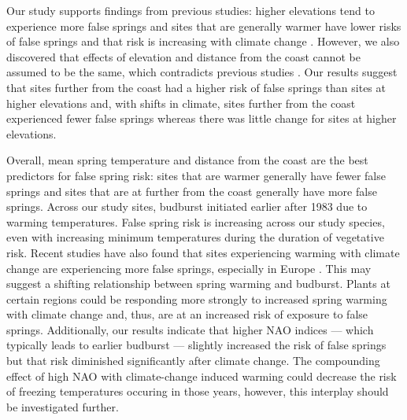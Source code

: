 \documentclass{article}\usepackage[]{graphicx}\usepackage[]{color}
\begin{document}
Our study supports findings from previous studies: higher elevations tend to experience more false springs \citep{Vitra2017} and sites that are generally warmer have lower risks of false springs \citep{Wypych2016} and that risk is increasing with climate change \citep{Liu2018}. However, we also discovered that effects of elevation and distance from the coast cannot be assumed to be the same, which contradicts previous studies \citep{Ma2018}. Our results suggest that sites further from the coast had a higher risk of false springs than sites at higher elevations and, with shifts in climate, sites further from the coast experienced fewer false springs whereas there was little change for sites at higher elevations. 
 
Overall, mean spring temperature and distance from the coast are the best predictors for false spring risk: sites that are warmer generally have fewer false springs and sites that are at further from the coast generally have more false springs. Across our study sites, budburst initiated earlier after 1983 due to warming temperatures. False spring risk is increasing across our study species, even with increasing minimum temperatures during the duration of vegetative risk. Recent studies have also found that sites experiencing warming with climate change are experiencing more false springs, especially in Europe \citep{Liu2018}. This may suggest a shifting relationship between spring warming and budburst. Plants at certain regions could be responding more strongly to increased spring warming with climate change and, thus, are at an increased risk of exposure to false springs. Additionally, our results indicate that higher NAO indices --- which typically leads to earlier budburst --- slightly increased the risk of false springs but that risk diminished significantly after climate change. The compounding effect of high NAO with climate-change induced warming could decrease the risk of freezing temperatures occuring in those years, however, this interplay should be investigated further. 
\end{document}

